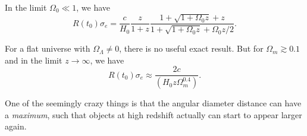 \documentclass[]{article}
\begin{document}
In the limit $\Omega_0\ll1$, we have
\begin{equation}
R(t_0)\sigma_e = \frac{c}{H_0} \frac{z}{1+z} \frac{1+\sqrt{1+\Omega_0 z}+z}{1+ \sqrt{1+\Omega_0 z} + \Omega_0 z/2}.
\end{equation}

For a flat universe with $\Omega_\Lambda\ne0$, there is no useful exact 
result.  But for $\Omega_m \gtrsim 0.1$ and in the limit $z\to\infty$, we have 
\begin{equation}
R(t_0)\sigma_e \approx \frac{2c}{(H_0 z \Omega_m^{0.4})}.
\end{equation}

One of the seemingly crazy things is that the angular diameter distance can have
a {\it maximum}, such that objects at high redshift actually can start to 
appear larger again.
\end{document}
